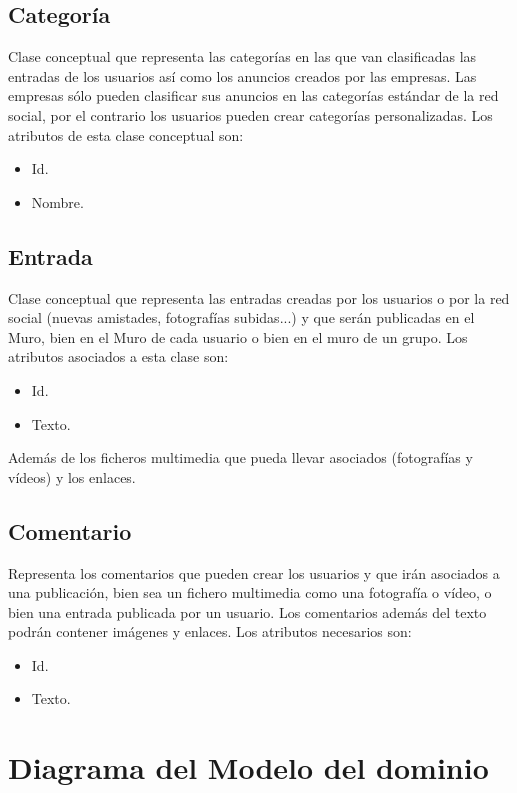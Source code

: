 \documentclass[12pt, a4paper, titlepage]{article}
\begin{document}
\subsection{Categoría}
	Clase conceptual que representa las categorías en las que van clasificadas las entradas de los usuarios así como los anuncios creados por las empresas. Las empresas sólo pueden clasificar sus anuncios en las categorías estándar de la red social, por el contrario los usuarios pueden crear categorías personalizadas.
	Los atributos de esta clase conceptual son:
	\begin{itemize}
		\item Id.
		\item Nombre.
	\end{itemize}
\subsection{Entrada}
	Clase conceptual que representa las entradas creadas por los usuarios o por la red social (nuevas amistades, fotografías subidas...) y que serán publicadas en el Muro, bien en el Muro de cada usuario o bien en el muro de un grupo. 
	Los atributos asociados a esta clase son:
	\begin{itemize}
		\item Id.
		\item Texto.
	\end{itemize}
	Además de los ficheros multimedia que pueda llevar asociados (fotografías y vídeos) y los enlaces.
\subsection{Comentario}
	Representa los comentarios que pueden crear los usuarios y que irán asociados a una publicación, bien sea un fichero multimedia como una fotografía o vídeo, o bien una entrada publicada por un usuario. Los comentarios además del texto podrán contener imágenes y enlaces.
	Los atributos necesarios son:
	\begin{itemize}
		\item Id.
		\item Texto.
	\end{itemize}


\section{Diagrama del Modelo del dominio}
\end{document}
